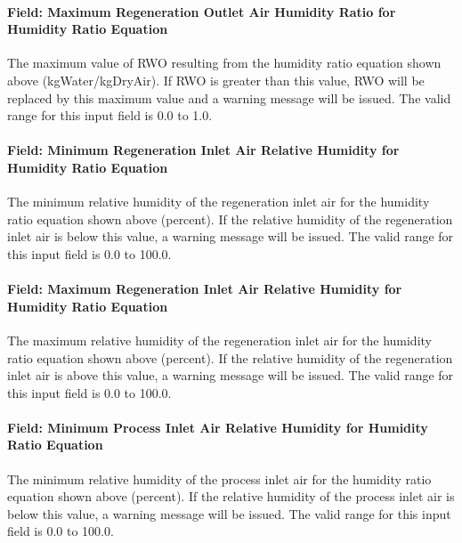 \paragraph{Field: Maximum Regeneration Outlet Air Humidity Ratio for Humidity Ratio Equation}\label{field-maximum-regeneration-outlet-air-humidity-ratio-for-humidity-ratio-equation}

The maximum value of RWO resulting from the humidity ratio equation shown above (kgWater/kgDryAir). If RWO is greater than this value, RWO will be replaced by this maximum value and a warning message will be issued. The valid range for this input field is 0.0 to 1.0.

\paragraph{Field: Minimum Regeneration Inlet Air Relative Humidity for Humidity Ratio Equation}\label{field-minimum-regeneration-inlet-air-relative-humidity-for-humidity-ratio-equation}

The minimum relative humidity of the regeneration inlet air for the humidity ratio equation shown above (percent). If the relative humidity of the regeneration inlet air is below this value, a warning message will be issued. The valid range for this input field is 0.0 to 100.0.

\paragraph{Field: Maximum Regeneration Inlet Air Relative Humidity for Humidity Ratio Equation}\label{field-maximum-regeneration-inlet-air-relative-humidity-for-humidity-ratio-equation}

The maximum relative humidity of the regeneration inlet air for the humidity ratio equation shown above (percent). If the relative humidity of the regeneration inlet air is above this value, a warning message will be issued. The valid range for this input field is 0.0 to 100.0.

\paragraph{Field: Minimum Process Inlet Air Relative Humidity for Humidity Ratio Equation}\label{field-minimum-process-inlet-air-relative-humidity-for-humidity-ratio-equation}

The minimum relative humidity of the process inlet air for the humidity ratio equation shown above (percent). If the relative humidity of the process inlet air is below this value, a warning message will be issued. The valid range for this input field is 0.0 to 100.0.

